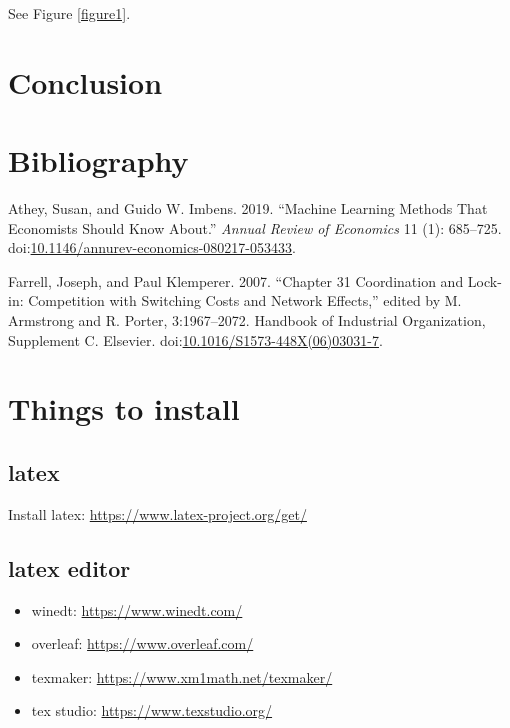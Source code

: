 \documentclass[11pt]{article}
\begin{document}
See Figure \ref{figure1}.


\section{Conclusion}
\label{sec:org488ea8a}



\section{Bibliography}
\label{sec:org56e9727}



\hypertarget{citeproc_bib_item_1}{Athey, Susan, and Guido W. Imbens. 2019. “Machine Learning Methods That Economists Should Know About.” \textit{Annual Review of Economics} 11 (1): 685–725. doi:\href{https://doi.org/10.1146/annurev-economics-080217-053433}{10.1146/annurev-economics-080217-053433}.}

\hypertarget{citeproc_bib_item_2}{Farrell, Joseph, and Paul Klemperer. 2007. “Chapter 31 Coordination and Lock-in: Competition with Switching Costs and Network Effects,” edited by M. Armstrong and R. Porter, 3:1967–2072. Handbook of Industrial Organization, Supplement C. Elsevier. doi:\href{https://doi.org/10.1016/S1573-448X(06)03031-7}{10.1016/S1573-448X(06)03031-7}.}





\newpage
\appendix


\section{Things to install}
\label{sec:orgea6af2f}
\label{sec:install}

\subsection{latex}
\label{sec:orgd31fa40}

Install latex: \url{https://www.latex-project.org/get/}



\subsection{latex editor}
\label{sec:org97b6068}

\begin{itemize}
\item winedt: \url{https://www.winedt.com/}
\item overleaf: \url{https://www.overleaf.com/}
\item texmaker: \url{https://www.xm1math.net/texmaker/}
\item tex studio: \url{https://www.texstudio.org/}
\end{itemize}
\end{document}
